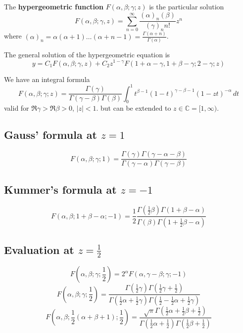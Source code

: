 \documentclass[10pt, oneside, reqno]{amsart}
\theoremstyle{plain}%
\theoremstyle{definition}
\theoremstyle{remark}
\newcommand{\Com}{\mathbb{C}}
\begin{document}
The \textbf{hypergeometric function} $F(\alpha, \beta; \gamma; z)$ is the particular solution \[
	F(\alpha, \beta; \gamma, z) = \sum_{n = 0}^\infty \frac{(\alpha)_n (\beta)}{(\gamma)_n n!} z^n 
\] where $(\alpha)_n = \alpha (\alpha + 1)\dots(\alpha + n - 1) = \frac{\Gamma(\alpha + n)}{\Gamma(\alpha)}$.  

The general solution of the hypergeometric equation is \[
	y  = C_1 F(\alpha, \beta; \gamma, z) + C_2 z^{1 - \gamma} F(1 + \alpha - \gamma, 1 + \beta - \gamma; 2 -\gamma; z)
\]

We have an integral formula \[
	F(\alpha, \beta; \gamma; z) = \frac{\Gamma(\gamma)}{\Gamma(\gamma - \beta)\Gamma(\beta)} \int_0^1 t^{\beta - 1} (1-t)^{\gamma - \beta - 1} (1- zt)^{- \alpha} \,dt
\] valid for $\Re \gamma > \Re \beta > 0$, $|z| < 1$. but can be extended to $z \in \Com = [1,\infty)$.

\subsection{Gauss' formula at $z = 1$} %
\label{sub:gauss_formula_at_z_1_}
	\[
		F(\alpha, \beta; \gamma; 1) = \frac{\Gamma(\gamma)\Gamma(\gamma - \alpha - \beta)}{\Gamma(\gamma - \alpha)\Gamma(\gamma - \beta)}
	\] 
\subsection{Kummer's formula at $z = -1$} %
\label{sub:kummer_s_formula_at_z_1_}
\[
	F(\alpha, \beta; 1 + \beta - \alpha; -1) = \frac{1}{2} \frac{\Gamma(\frac{1}{2}\beta)\Gamma(1 + \beta - \alpha)}{\Gamma(\beta) \Gamma(1 + \frac{1}{2}\beta - \alpha)}
\]

\subsection{Evaluation at $z = \frac{1}{2}$} %
\label{sub:evaluation_at_z_1_2_}
	\[
		F(\alpha, \beta; \gamma; \frac{1}{2}) = 2^\alpha F(\alpha, \gamma - \beta; \gamma; -1)
	\]
	\[
		F(\alpha, \beta; \gamma; \frac{1}{2}) = \frac{\Gamma(\frac{1}{2}\gamma) \Gamma(\frac{1}{2}\gamma + \frac{1}{2})}{\Gamma(\frac{1}{2}\alpha + \frac{1}{2}\gamma)\Gamma(\frac{1}{2} - \frac{1}{2}\alpha + \frac{1}{2}\gamma)}
	\]
	\[
		F(\alpha, \beta; \frac{1}{2}(\alpha + \beta +1); \frac{1}{2}) = \frac{ \sqrt{\pi} \Gamma(\frac{1}{2}\alpha + \frac{1}{2}\beta + \frac{1}{2})}{\Gamma(\frac{1}{2}\alpha + \frac{1}{2})\Gamma(\frac{1}{2}\beta + \frac{1}{2})}
	\]

\end{document}
